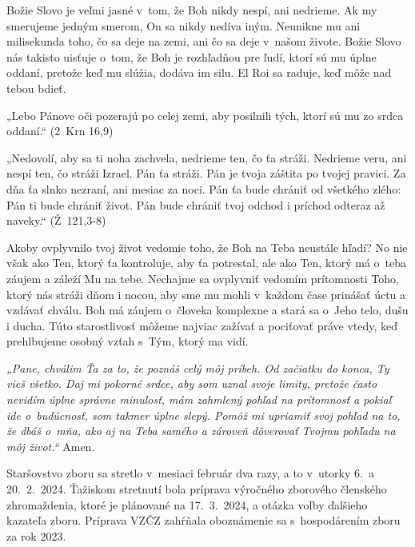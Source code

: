 
Božie Slovo je veľmi jasné v~tom, že Boh nikdy nespí, ani nedrieme. Ak my smerujeme jedným smerom, On sa nikdy nedíva iným. Neunikne mu ani milisekunda toho, čo sa deje na zemi, ani čo sa deje v~našom živote. Božie Slovo nás takisto uisťuje o~tom, že Boh je rozhľadňou pre ľudí, ktorí sú mu úplne oddaní, pretože keď mu slúžia, dodáva im silu. El Roi sa raduje, keď môže nad tebou bdieť.


„Lebo Pánove oči pozerajú po celej zemi, aby posilnili tých, ktorí sú mu zo srdca oddaní.“ (2~Krn 16,9)

„Nedovolí, aby sa ti noha zachvela, nedrieme ten, čo ťa stráži. Nedrieme veru, ani nespí ten, čo stráži Izrael. Pán ťa stráži. Pán je tvoja záštita po tvojej pravici. Za dňa ťa slnko nezraní, ani mesiac za noci. Pán ťa bude chrániť od všetkého zlého: Pán ti bude chrániť život. Pán bude chrániť tvoj odchod i príchod odteraz až naveky.“ (Ž~121,3-8)

Akoby ovplyvnilo tvoj život vedomie toho, že Boh na Teba neustále hľadí? No nie však ako Ten, ktorý ťa kontroluje, aby ťa potrestal, ale ako Ten, ktorý má o~teba záujem a záleží Mu na tebe. Nechajme sa ovplyvniť vedomím prítomnosti Toho, ktorý nás stráži dňom i nocou, aby sme mu mohli v~každom čase prinášať úctu a vzdávať chválu. Boh má záujem o~človeka komplexne a stará sa o~Jeho telo, dušu i ducha. Túto starostlivosť môžeme najviac zažívať a pociťovať práve vtedy, keď prehlbujeme osobný vzťah s~Tým, ktorý ma vidí.

{\it „Pane, chválim Ťa za to, že poznáš celý môj príbeh. Od začiatku do konca, Ty vieš všetko. Daj mi pokorné srdce, aby som uznal svoje limity, pretože často nevidím úplne správne minulosť, mám zahmlený pohľad na prítomnosť a pokiaľ ide o~budúcnosť, som takmer úplne slepý. Pomôž mi upriamiť svoj pohľad na to, že dbáš o~mňa, ako aj na Teba samého a zároveň dôverovať Tvojmu pohľadu na môj život.“} Amen.




Staršovstvo zboru sa stretlo v~mesiaci február dva razy, a to v~utorky 6.~a 20.~2.~2024.
Ťažiskom stretnutí bola príprava výročného zborového členského zhromaždenia, ktoré je plánované na 17.~3.~2024, a otázka voľby ďalšieho kazateľa zboru. Príprava VZČZ zahŕňala oboznámenie sa s~hospodárením zboru za rok 2023.

